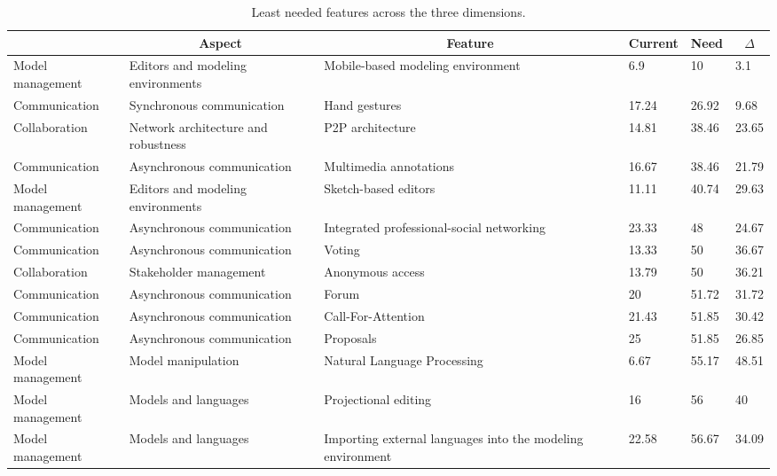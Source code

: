 
  \begin{table*}[]
  \centering
  \notsotiny
  \caption{ Least needed features across the three dimensions.}
\label{tab:least-needed}
\begin{tabular}{|l|l|l|l|l|l|}
  \hline
  \rowcolor[HTML]{C0C0C0}
    \multicolumn{1}{|c|}{Dimension} & \multicolumn{1}{c|}{Aspect} & \multicolumn{1}{c|}{Feature} & \multicolumn{1}{c|}{Current} & \multicolumn{1}{c|}{Need} & \multicolumn{1}{c|}{$\Delta$} \\ \hline
    Model management & Editors and modeling environments & Mobile-based modeling environment & 6.9 & 10 & 3.1 \\ \hline 
Communication & Synchronous communication & Hand gestures & 17.24 & 26.92 & 9.68 \\ \hline 
Collaboration & Network architecture and robustness & P2P architecture & 14.81 & 38.46 & 23.65 \\ \hline 
Communication & Asynchronous communication & Multimedia annotations & 16.67 & 38.46 & 21.79 \\ \hline 
Model management & Editors and modeling environments & Sketch-based editors & 11.11 & 40.74 & 29.63 \\ \hline 
Communication & Asynchronous communication & Integrated professional-social networking & 23.33 & 48 & 24.67 \\ \hline 
Communication & Asynchronous communication & Voting & 13.33 & 50 & 36.67 \\ \hline 
Collaboration & Stakeholder management & Anonymous access & 13.79 & 50 & 36.21 \\ \hline 
Communication & Asynchronous communication & Forum & 20 & 51.72 & 31.72 \\ \hline 
Communication & Asynchronous communication & Call-For-Attention & 21.43 & 51.85 & 30.42 \\ \hline 
Communication & Asynchronous communication & Proposals & 25 & 51.85 & 26.85 \\ \hline 
Model management & Model manipulation & Natural Language Processing & 6.67 & 55.17 & 48.51 \\ \hline 
Model management & Models and languages & Projectional editing & 16 & 56 & 40 \\ \hline 
Model management & Models and languages & Importing external languages into the modeling environment & 22.58 & 56.67 & 34.09 \\ \hline 

\end{tabular}
\end{table*}
